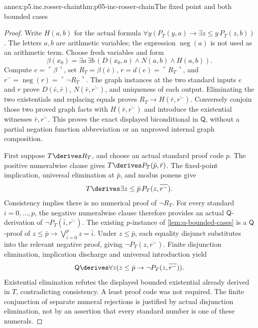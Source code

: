 \begin{annexitem}{annex:p5.inc.rosser-chain}{thm:p05-inc-rosser-chain}{The fixed point and both bounded cases}
\begin{proof}
Write \(H(a,b)\) for the actual formula
\(\forall y(P_T(y,a)\to\exists z\leq y\,P_T(z,b))\).
The letters \(a,b\) are arithmetic variables; the expression
\(\operatorname{neg}(a)\) is not used as an arithmetic term.
Choose fresh variables and form
\[
 \beta(x_0)=\exists a\,\exists b\,
                   (D(x_0,a)\land N(a,b)\land H(a,b)).
\]
Compute \(e=\ulcorner\beta\urcorner\), set \(R_T=\beta(\bar e)\),
\(r=d(e)=\ulcorner R_T\urcorner\), and
\(r^-=\operatorname{neg}(r)=\ulcorner\neg R_T\urcorner\).
The graph instances at the two standard inputs \(e\) and \(r\)
prove \(D(\bar e,\bar r)\), \(N(\bar r,\overline{r^-})\),
and uniqueness of each output. Eliminating the two existentials
and replacing equals proves \(R_T\to H(\bar r,\overline{r^-})\).
Conversely conjoin those two proved graph facts with
\(H(\bar r,\overline{r^-})\) and introduce the existential witnesses
\(\bar r,\overline{r^-}\). This proves the exact displayed
biconditional in \(\mathsf Q\), without a partial negation function
abbreviation or an unproved internal graph composition.

First suppose \(T\derives R_T\), and choose an actual standard
proof code \(p\). The positive numeralwise clause gives
\(T\derives P_T(\bar p,\bar r)\). The fixed-point implication,
universal elimination at \(\bar p\), and modus ponens give
\[
 T\derives\exists z\leq\bar p\,P_T(z,\overline{r^-}).
\]
Consistency implies there is no numerical proof of \(\neg R_T\).
For every standard \(i=0,\ldots,p\), the negative numeralwise
clause therefore provides an actual \(\mathsf Q\)-derivation of
\(\neg P_T(\bar i,\overline{r^-})\).
The existing \(p\)-instance of \cref{lem:q-bounded-cases} is a
\(\mathsf Q\)-proof of
\(z\leq\bar p\to\bigvee_{i=0}^p z=\bar i\).
Under \(z\leq\bar p\), each equality disjunct substitutes into
the relevant negative proof, giving \(\neg P_T(z,\overline{r^-})\).
Finite disjunction elimination, implication discharge and universal
introduction yield
\[
 \mathsf Q\derives\forall z
       (z\leq\bar p\to\neg P_T(z,\overline{r^-})).
\]
Existential elimination refutes the displayed bounded existential
already derived in \(T\), contradicting consistency. A least proof
code was not required. The finite conjunction of separate numeral
rejections is justified by actual disjunction elimination, not by
an assertion that every standard number is one of these numerals.


\end{proof}
\end{annexitem}
